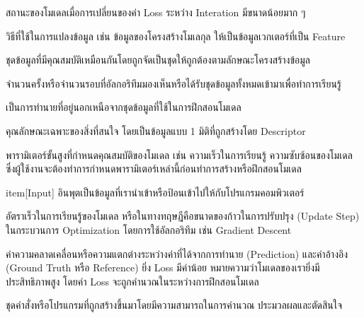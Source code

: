 \begin{description}[style=nextline]
    \item[Convergence] สถานะของโมเดลเมื่อการเปลี่ยนของค่า Loss ระหว่าง Interation มีขนาดน้อยมาก ๆ

    \item[Descriptor] วิธีที่ใช้ในการแปลงข้อมูล เช่น ข้อมูลของโครงสร้างโมเลกุล ให้เป็นข้อมูลเวกเตอร์ที่เป็น Feature

    \item[Dataset หรือ Data Set] ชุดข้อมูลที่มีคุณสมบัติเหมือนกันโดยถูกจัดเป็นชุดให้ถูกต้องตามลักษณะโครงสร้างข้อมูล

    \item[Epoch] จำนวนครั้งหรือจำนวนรอบที่อัลกอริทึมมองเห็นหรือได้รับชุดข้อมูลทั้งหมดเข้ามาเพื่อทำการเรียนรู้

    \item[Extrapolation] เป็นการทำนายที่อยู่นอกเหนือจากชุดข้อมูลที่ใช้ในการฝึกสอนโมเดล

    \item[Feature] คุณลักษณะเฉพาะของสิ่งที่สนใจ โดยเป็นข้อมูลแบบ 1 มิติที่ถูกสร้างโดย Descriptor

    \item[Hyperparameter] พารามิเตอร์ขั้นสูงที่กำหนดคุณสมบัติของโมเดล เช่น ความเร็วในการเรียนรู้ ความซับซ้อนของโมเดล
    ซึ่งผู้ใช้งานจะต้องทำการกำหนดพารามิเตอร์เหล่านี้ก่อนทำการสร้างหรือฝึกสอนโมเดล

    item[Input] อินพุตเป็นข้อมูลที่เรานำเข้าหรือป้อนเข้าไปให้กับโปรแกรมคอมพิวเตอร์

    \item[Learning Rate] อัตราเร็วในการเรียนรู้ของโมเดล หรือในทางทฤษฎีคือขนาดของก้าวในการปรับปรุง (Update Step) ในกระบวนการ 
    Optimization โดยการใช้อัลกอริทึม เช่น Gradient Descent

    \item[Loss] ค่าความคลาดเคลื่อนหรือความแตกต่างระหว่างค่าที่ได้จากการทำนาย (Prediction) และค่าอ้างอิง (Ground Truth หรือ 
    Reference) ยิ่ง Loss มีค่าน้อย หมายความว่าโมเดลของเรายิ่งมีประสิทธิภาพสูง โดยค่า Loss จะถูกคำนวณในระหว่างการฝึกสอนโมเดล

    \item[Model] ชุดคำสั่งหรือโปรแกรมที่ถูกสร้างขึ้นมาโดยมีความสามารถในการคำนวณ ประมวลผลและตัดสินใจ


\end{description}
